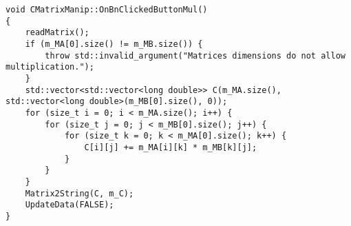 \begin{lstlisting}
void CMatrixManip::OnBnClickedButtonMul()
{
    readMatrix();
    if (m_MA[0].size() != m_MB.size()) {
        throw std::invalid_argument("Matrices dimensions do not allow multiplication.");
    }
    std::vector<std::vector<long double>> C(m_MA.size(), std::vector<long double>(m_MB[0].size(), 0));
    for (size_t i = 0; i < m_MA.size(); i++) {
        for (size_t j = 0; j < m_MB[0].size(); j++) {
            for (size_t k = 0; k < m_MA[0].size(); k++) {
                C[i][j] += m_MA[i][k] * m_MB[k][j];
            }
        }
    } 
    Matrix2String(C, m_C);
    UpdateData(FALSE);
}


\end{lstlisting}